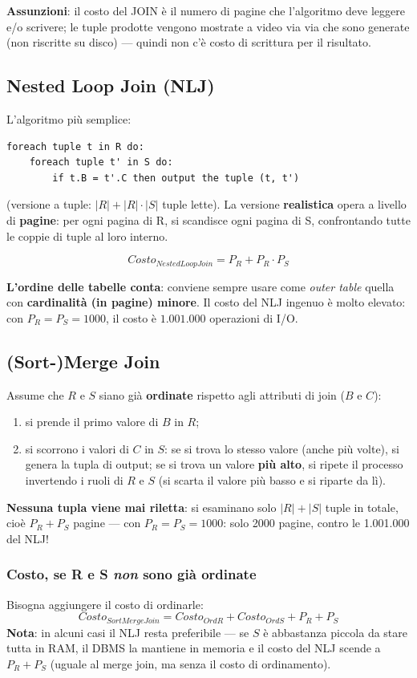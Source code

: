 \documentclass[12pt, a4paper]{article}
\begin{document}
\textbf{Assunzioni}: il costo del JOIN è il numero di pagine che l'algoritmo deve leggere e/o scrivere; le tuple prodotte vengono mostrate a video via via che sono generate (non riscritte su disco) — quindi non c'è costo di scrittura per il risultato.

\subsection{Nested Loop Join (NLJ)}
L'algoritmo più semplice:
\begin{verbatim}
foreach tuple t in R do:
    foreach tuple t' in S do:
        if t.B = t'.C then output the tuple (t, t')
\end{verbatim}
(versione a tuple: $|R| + |R|\cdot|S|$ tuple lette). La versione \textbf{realistica} opera a livello di \textbf{pagine}: per ogni pagina di R, si scandisce ogni pagina di S, confrontando tutte le coppie di tuple al loro interno.

$$Costo_{NestedLoopJoin} = P_R + P_R \cdot P_S$$

\textbf{L'ordine delle tabelle conta}: conviene sempre usare come \textit{outer table} quella con \textbf{cardinalità (in pagine) minore}. Il costo del NLJ ingenuo è molto elevato: con $P_R=P_S=1000$, il costo è $1.001.000$ operazioni di I/O.

\subsection{(Sort-)Merge Join}
Assume che $R$ e $S$ siano già \textbf{ordinate} rispetto agli attributi di join ($B$ e $C$):
\begin{enumerate}
    \item si prende il primo valore di $B$ in $R$;
    \item si scorrono i valori di $C$ in $S$: se si trova lo stesso valore (anche più volte), si genera la tupla di output; se si trova un valore \textbf{più alto}, si ripete il processo invertendo i ruoli di $R$ e $S$ (si scarta il valore più basso e si riparte da lì).
\end{enumerate}
\textbf{Nessuna tupla viene mai riletta}: si esaminano solo $|R|+|S|$ tuple in totale, cioè $P_R + P_S$ pagine — con $P_R=P_S=1000$: solo 2000 pagine, contro le 1.001.000 del NLJ!

\subsubsection{Costo, se R e S \emph{non} sono già ordinate}
Bisogna aggiungere il costo di ordinarle:
$$Costo_{SortMergeJoin} = Costo_{OrdR} + Costo_{OrdS} + P_R + P_S$$
\textbf{Nota}: in alcuni casi il NLJ resta preferibile — se $S$ è abbastanza piccola da stare tutta in RAM, il DBMS la mantiene in memoria e il costo del NLJ scende a $P_R + P_S$ (uguale al merge join, ma senza il costo di ordinamento).
\end{document}

